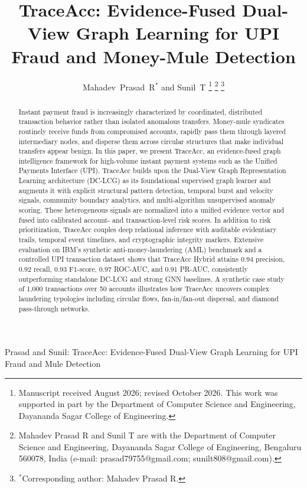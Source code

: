 \documentclass[journal]{IEEEtran}
\begin{document}
\title{TraceAcc: Evidence-Fused Dual-View Graph Learning for UPI Fraud and Money-Mule Detection}

\author{Mahadev~Prasad~R$^*$ and Sunil~T%
\thanks{Manuscript received August 2026; revised October 2026. This work was supported in part by the Department of Computer Science and Engineering, Dayananda Sagar College of Engineering.}%
\thanks{Mahadev Prasad R and Sunil T are with the Department of Computer Science and Engineering, Dayananda Sagar College of Engineering, Bengaluru 560078, India (e-mail: prasad79755@gmail.com; sunilt808@gmail.com).}%
\thanks{$^*$Corresponding author: Mahadev Prasad R.}%
}

%
{Prasad and Sunil: TraceAcc: Evidence-Fused Dual-View Graph Learning for UPI Fraud and Mule Detection}

\maketitle

\begin{abstract}
Instant payment fraud is increasingly characterized by coordinated, distributed transaction behavior rather than isolated anomalous transfers. Money-mule syndicates routinely receive funds from compromised accounts, rapidly pass them through layered intermediary nodes, and disperse them across circular structures that make individual transfers appear benign. In this paper, we present TraceAcc, an evidence-fused graph intelligence framework for high-volume instant payment systems such as the Unified Payments Interface (UPI). TraceAcc builds upon the Dual-View Graph Representation Learning architecture (DC-LCG) as its foundational supervised graph learner and augments it with explicit structural pattern detection, temporal burst and velocity signals, community boundary analytics, and multi-algorithm unsupervised anomaly scoring. These heterogeneous signals are normalized into a unified evidence vector and fused into calibrated account- and transaction-level risk scores. In addition to risk prioritization, TraceAcc couples deep relational inference with auditable evidentiary trails, temporal event timelines, and cryptographic integrity markers. Extensive evaluation on IBM's synthetic anti-money-laundering (AML) benchmark and a controlled UPI transaction dataset shows that TraceAcc Hybrid attains 0.94 precision, 0.92 recall, 0.93 F1-score, 0.97 ROC-AUC, and 0.91 PR-AUC, consistently outperforming standalone DC-LCG and strong GNN baselines. A synthetic case study of 1,000 transactions over 50 accounts illustrates how TraceAcc uncovers complex laundering typologies including circular flows, fan-in/fan-out dispersal, and diamond pass-through networks.
\end{abstract}
\end{document}
